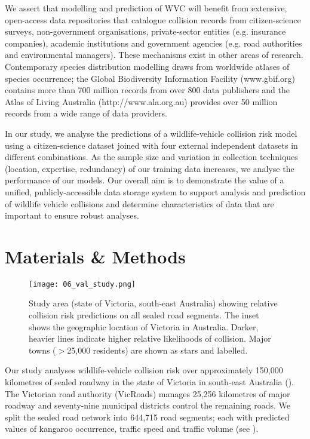 We assert that modelling and prediction of WVC will benefit from extensive, open-access data repositories that catalogue collision records from citizen-science surveys, non-government organisations, private-sector entities (e.g. insurance companies), academic institutions and government agencies (e.g. road authorities and environmental managers). These mechanisms exist in other areas of research. Contemporary species distribution modelling draws from worldwide atlases of species occurrence; the Global Biodiversity Information Facility (www.gbif.org) contains more than 700 million records from over 800 data publishers and the Atlas of Living Australia (http://www.ala.org.au) provides over 50 million records from a wide range of data providers.

In our study, we analyse the predictions of a wildlife-vehicle collision risk model using a citizen-science dataset joined with four external independent datasets in different combinations. As the sample size and variation in collection techniques (location, expertise, redundancy) of our training data increases, we analyse the performance of our models. Our overall aim is to demonstrate the value of a unified, publicly-accessible data storage system to support analysis and prediction of wildlife vehicle collisions and determine characteristics of data that are important to ensure robust analyses.

\section{Materials \& Methods}

\begin{figure*}[htp]
  \centering
  \texttt{[image: 06\_val\_study.png]}
  \caption[]{Study area (state of Victoria, south-east Australia) showing relative collision risk predictions on all sealed road segments. The inset shows the geographic location of Victoria in Australia. Darker, heavier lines indicate higher relative likelihoods of collision. Major towns ($>$25,000 residents) are shown as stars and labelled.}
  \label{val_study_area}
\end{figure*}

Our study analyses wildlife-vehicle collision risk over approximately 150,000 kilometres of sealed roadway in the state of Victoria in south-east Australia (). The Victorian road authority (VicRoads) manages 25,256 kilometres of major roadway and seventy-nine municipal districts control the remaining roads. We split the sealed road network into 644,715 road segments; each with predicted values of kangaroo occurrence, traffic speed and traffic volume (see ).

